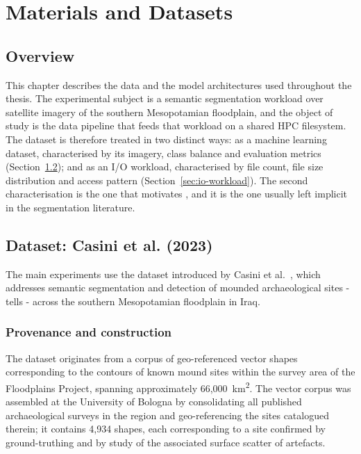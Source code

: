 \section{Materials and Datasets}
\label{ch:materials}

\subsection{Overview}

This chapter describes the data and the model architectures used throughout the
thesis.
The experimental subject is a semantic segmentation workload over satellite imagery
of the southern Mesopotamian floodplain, and the object of study is the data
pipeline that feeds that workload on a shared HPC filesystem.
The dataset is therefore treated in two distinct ways: as a machine learning
dataset, characterised by its imagery, class balance and evaluation metrics
(Section~\ref{sec:dataset}); and as an I/O workload, characterised by file count,
file size distribution and access pattern (Section~\ref{sec:io-workload}).
The second characterisation is the one that motivates \pads{}, and it is the one
usually left implicit in the segmentation literature.

\subsection{Dataset: Casini et al. (2023)}
\label{sec:dataset}

The main experiments use the dataset introduced by Casini et al.~\cite{Casini23},
which addresses semantic segmentation and detection of mounded archaeological sites
- tells - across the southern Mesopotamian floodplain in Iraq.

\subsubsection{Provenance and construction}

The dataset originates from a corpus of geo-referenced vector shapes corresponding
to the contours of known mound sites within the survey area of the Floodplains
Project, spanning approximately 66{,}000~km\textsuperscript{2}.
The vector corpus was assembled at the University of Bologna by consolidating all
published archaeological surveys in the region and geo-referencing the sites
catalogued therein; it contains 4{,}934 shapes, each corresponding to a site
confirmed by ground-truthing and by study of the associated surface scatter of
artefacts.

